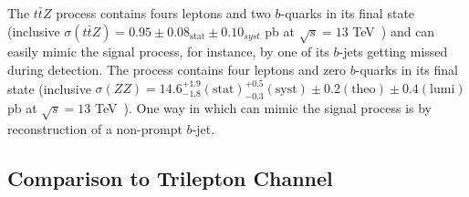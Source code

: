 \vspace{1cm}
The $t\bar{t}Z$ process contains fours leptons and two $b$-quarks in its final state (inclusive $\sigma(t\bar{t}Z)= 0.95 \pm 0.08_{\text{stat}} \pm 0.10_{syst}$ pb at $\sqrt{s}=13$ TeV~\cite{ttz-xsec-paper}) and can easily mimic the \tWZ signal process, for instance, by one of its $b$-jets getting missed during detection. The \ZZ process contains four leptons and zero $b$-quarks in its final state (inclusive $\sigma(ZZ)= 14.6^{+1.9}_{-1.8}(\text{stat})^{+0.5}_{-0.3}(\text{syst})\pm 0.2 (\text{theo})\pm 0.4 (\text{lumi})$ pb at $\sqrt{s}=13$ TeV~\cite{zz-xsec-paper}). One way in which \ZZ can mimic the \tWZ signal process is by reconstruction of a non-prompt $b$-jet. 



\subsection{Comparison to Trilepton Channel}



